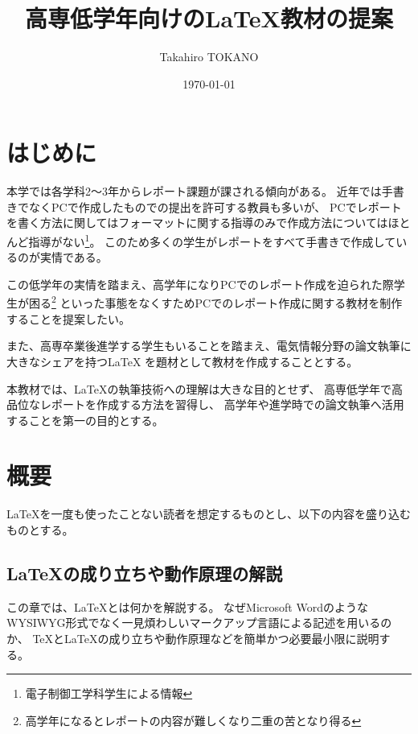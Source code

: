 \documentclass[uplatex]{jsarticle}
\title{高専低学年向けの\LaTeX 教材の提案}
\author{Takahiro TOKANO}
\date{\today}
\begin{document}
\maketitle

\section{はじめに}
	本学では各学科2～3年からレポート課題が課される傾向がある。
	近年では手書きでなくPCで作成したものでの提出を許可する教員も多いが、
	PCでレポートを書く方法に関してはフォーマットに関する指導のみで作成方法についてはほとんど指導がない\footnote{電子制御工学科学生による情報}。
	このため多くの学生がレポートをすべて手書きで作成しているのが実情である。

	この低学年の実情を踏まえ、高学年になりPCでのレポート作成を迫られた際学生が困る\footnote{高学年になるとレポートの内容が難しくなり二重の苦となり得る}
	といった事態をなくすためPCでのレポート作成に関する教材を制作することを提案したい。

	また、高専卒業後進学する学生もいることを踏まえ、電気情報分野の論文執筆に大きなシェアを持つ\LaTeX
    を題材として教材を作成することとする。
    
    本教材では、\LaTeX の執筆技術への理解は大きな目的とせず、
    高専低学年で高品位なレポートを作成する方法を習得し、
    高学年や進学時での論文執筆へ活用することを第一の目的とする。

\section{概要}
	\LaTeX を一度も使ったことない読者を想定するものとし、以下の内容を盛り込むものとする。

    
    \subsection{\LaTeX の成り立ちや動作原理の解説}
        この章では、\LaTeX とは何かを解説する。
        なぜMicrosoft WordのようなWYSIWYG形式でなく一見煩わしいマークアップ言語による記述を用いるのか、
        \TeX と\LaTeX の成り立ちや動作原理などを簡単かつ必要最小限に説明する。
\end{document}
